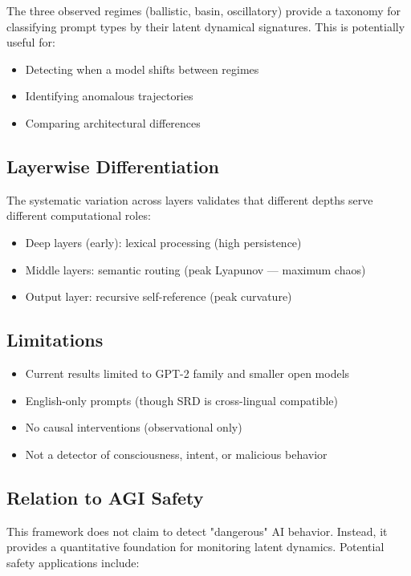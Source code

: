\documentclass[12pt,a4paper]{article}
\begin{document}
The three observed regimes (ballistic, basin, oscillatory) provide a taxonomy for classifying prompt types by their latent dynamical signatures. This is potentially useful for:
\begin{itemize}[noitemsep]
    \item Detecting when a model shifts between regimes
    \item Identifying anomalous trajectories
    \item Comparing architectural differences
\end{itemize}

\subsection{Layerwise Differentiation}

The systematic variation across layers validates that different depths serve different computational roles:
\begin{itemize}[noitemsep]
    \item Deep layers (early): lexical processing (high persistence)
    \item Middle layers: semantic routing (peak Lyapunov — maximum chaos)
    \item Output layer: recursive self-reference (peak curvature)
\end{itemize}

\subsection{Limitations}

\begin{itemize}[noitemsep]
    \item Current results limited to GPT-2 family and smaller open models
    \item English-only prompts (though SRD is cross-lingual compatible)
    \item No causal interventions (observational only)
    \item Not a detector of consciousness, intent, or malicious behavior
\end{itemize}

\subsection{Relation to AGI Safety}

This framework does not claim to detect "dangerous" AI behavior. Instead, it provides a quantitative foundation for monitoring latent dynamics. Potential safety applications include:
\end{document}
